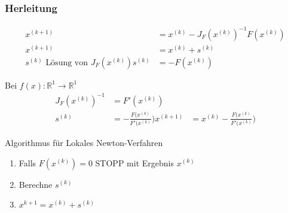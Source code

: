\documentclass[
	ngerman,
	accentcolor=9c,%
	type=intern,
	marginpar=false
	]{tudapub}
\begin{document}
                \subsubsection{Herleitung}
                \begin{satz}
                    \begin{align*}
                        x^{(k+1)} &= x^{(k)} - J_{F}(x^{(k)})^{-1}F(x^{(k)})\\
                        x^{(k+1)} &= x^{(k)} + s^{(k)}\\
                        s^{(k)} \text{ Lösung von } J_F(x^{(k)})s^{(k)} &= - F(x^{(k)})
                    \end{align*}
                \end{satz}
                Bei $f(x) : \mathbb{R}^1\rightarrow\mathbb{R}^1$
                \begin{align*}
                    J_{F}(x^{(k)})^{-1} &= F'(x^{(k)})\\
                    s^{(k)} &= - \frac{F(x^{(k)}}{F'(x^{(k)}})
                    x^{(k+1)} &= x^{(k)} - \frac{F(x^{(k)}}{F'(x^{(k)}})
                \end{align*}
                \begin{satz}
                    Algorithmus für Lokales Newton-Verfahren
                    \begin{enumerate}
                        \item Falls $F(x^{(k)}) = 0$ STOPP mit Ergebnis $x^{(k)}$
                        \item Berechne $s^{(k)}$
                        \item $x^{k+1} = x^{(k)} + s^{(k)}$
                    \end{enumerate}
                \end{satz}
\end{document}
